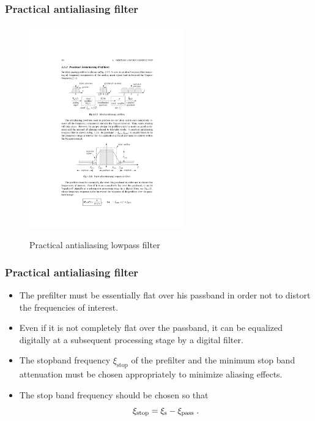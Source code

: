 \begin{frame}
\frametitle{Practical antialiasing filter}

\begin{figure}
  \centering
  \includegraphics[width=0.6\textwidth]{PracticalAntiAlias}\\
  \caption{Practical antialiasing lowpass filter}
\end{figure}

\end{frame}

\begin{frame}
\frametitle{Practical antialiasing filter}
\begin{itemize}
\item The prefilter must be essentially flat over his passband in order not to distort the frequencies of interest.
\item Even if it is not completely flat over the passband, it can be \alert{equalized} digitally at a subsequent processing stage by a \alert{digital filter}.
\item The \alert{stopband frequency} $\xi_{\mathrm{stop}}$ of the prefilter and the \alert{minimum stop band attenuation} must be chosen appropriately to minimize aliasing effects.
\item The stop band frequency should be chosen so that
\[
\xi_{\mathrm{stop}}= \xi_{\mathrm{s}} - \xi_{\mathrm{pass}} \;.
\]
\end{itemize}
\end{frame}

